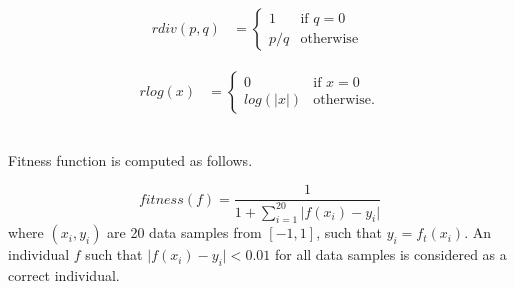 \documentclass[conference]{IEEEtran}
\begin{document}
\noindent
\begin{minipage}{.5\linewidth}
\begin{align*}
rdiv(p,q) &= \begin{cases} 1 &\mbox{if } q = 0 \\
p/q & \mbox{otherwise } \end{cases}  
\end{align*}
\end{minipage}%

\begin{minipage}{.5\linewidth}
\begin{align*}
rlog(x) &= \begin{cases} 0 &\mbox{if } x = 0 \\
log(\vert x\vert) & \mbox{otherwise}. \end{cases}
\end{align*}
\end{minipage}

~\\

Fitness function is computed as follows.

$$ fitness(f) =  \frac{1}{1+ \sum\limits_{i=1}^{20}{ \vert f(x_i)-y_i }\vert }  $$
where $(x_i,y_i)$ are 20 data samples from $[-1,1]$, such that $y_i = f_t(x_i)$.
An individual $f$ such that $\vert f(x_i)-y_i \vert < 0.01 $ for all data samples is 
considered as a correct individual.\\
\end{document}
